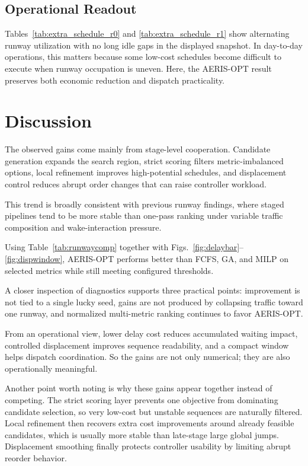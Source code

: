 \documentclass[conference]{IEEEtran}
\begin{document}
\subsection{Operational Readout}
Tables~\ref{tab:extra_schedule_r0} and \ref{tab:extra_schedule_r1} show alternating runway utilization with no long idle gaps in the displayed snapshot. In day-to-day operations, this matters because some low-cost schedules become difficult to execute when runway occupation is uneven. Here, the AERIS-OPT result preserves both economic reduction and dispatch practicality.

\section{Discussion}
The observed gains come mainly from stage-level cooperation. Candidate generation expands the search region, strict scoring filters metric-imbalanced options, local refinement improves high-potential schedules, and displacement control reduces abrupt order changes that can raise controller workload.

This trend is broadly consistent with previous runway findings, where staged pipelines tend to be more stable than one-pass ranking under variable traffic composition and wake-interaction pressure.

Using Table~\ref{tab:runwaycomp} together with Figs.~\ref{fig:delaybar}--\ref{fig:dispwindow}, AERIS-OPT performs better than FCFS, GA, and MILP on selected metrics while still meeting configured thresholds.

A closer inspection of diagnostics supports three practical points: improvement is not tied to a single lucky seed, gains are not produced by collapsing traffic toward one runway, and normalized multi-metric ranking continues to favor AERIS-OPT.

From an operational view, lower delay cost reduces accumulated waiting impact, controlled displacement improves sequence readability, and a compact window helps dispatch coordination. So the gains are not only numerical; they are also operationally meaningful.

Another point worth noting is why these gains appear together instead of competing. The strict scoring layer prevents one objective from dominating candidate selection, so very low-cost but unstable sequences are naturally filtered. Local refinement then recovers extra cost improvements around already feasible candidates, which is usually more stable than late-stage large global jumps. Displacement smoothing finally protects controller usability by limiting abrupt reorder behavior.
\end{document}
